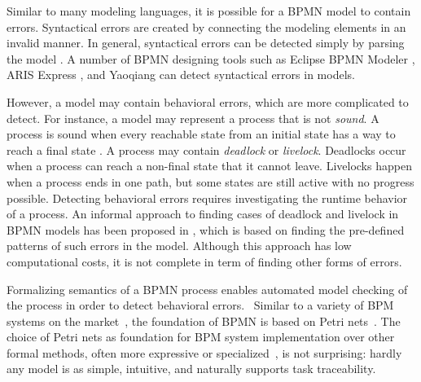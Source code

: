 Similar to many modeling languages, it is possible for a BPMN model to contain errors. Syntactical errors are created by connecting the modeling elements in an invalid manner. %
 In general, syntactical errors can be detected simply by parsing the model \cite{deadlockbpmn}. A number of BPMN designing tools such as Eclipse BPMN Modeler \cite{BPMN2modeler}, ARIS Express \cite{arisexpress}, and Yaoqiang \cite{Yaoqiang} can detect syntactical errors in models. 

However, a model may contain behavioral errors, which are more complicated to detect. For instance, a model may represent a process that is not \emph{sound}. A process is sound when every reachable state from an initial state has a way to reach a final state \cite{RPU+07}. A process may contain \emph{deadlock} or \emph{livelock}. Deadlocks occur when a process can reach a non-final state that it cannot leave. Livelocks happen when a process ends in one path, but some states are still active with no progress possible. Detecting behavioral errors requires investigating the runtime behavior of a process. An informal approach to finding cases of deadlock and livelock in BPMN models has been proposed in \cite{deadlockbpmn} \cite{livelock2gholoo}, which is based on finding the pre-defined patterns of such errors in the model. Although this approach has low computational costs, it is not complete in term of finding other forms of errors. 

Formalizing semantics of a BPMN process enables automated model checking of the process in order to  detect behavioral errors. 
\ 
Similar to a variety of BPM systems on the market~\cite{Dumas:2013:FBP:2462579}, the foundation of BPMN is based on  Petri nets~\cite{vanderAalst2004}. The choice of Petri nets as foundation for BPM system implementation over other formal methods, often more expressive or   specialized~\cite{Bruni:2005:TFC:1040305.1040323,Butler:2004:TSL:2178738.2178750}, is not surprising: hardly any model is as simple, intuitive, and naturally supports task traceability.

